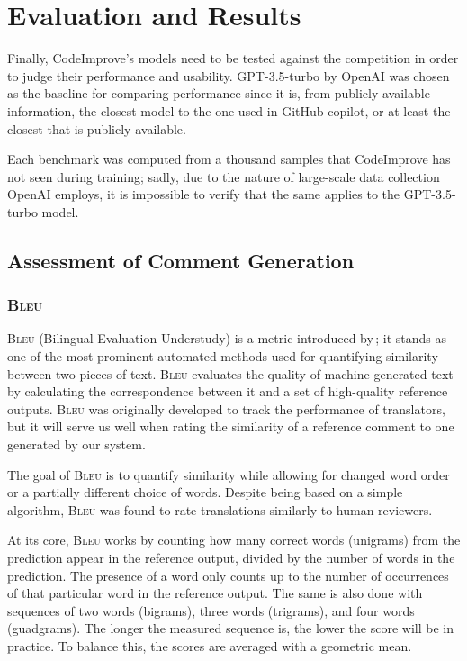 \chapter{Evaluation and Results}
    Finally, CodeImprove's models need to be tested against the competition in order to judge their performance and usability.  GPT-3.5-turbo by OpenAI was chosen as the baseline for comparing performance since it is, from publicly available information, the closest model to the one used in GitHub copilot, or at least the closest that is publicly available.
    
    Each benchmark was computed from a thousand samples that CodeImprove has not seen during training; sadly, due to the nature of large-scale data collection OpenAI employs, it is impossible to verify that the same applies to the GPT-3.5-turbo model.
    
    \section{Assessment of Comment Generation}
        \subsection{\textsc{Bleu}}
        \textsc{Bleu} (Bilingual Evaluation Understudy) is a metric introduced by\,\cite{papineni-etal-2002-bleu}; it stands as one of the most prominent automated methods used for quantifying similarity between two pieces of text. \textsc{Bleu} evaluates the quality of machine-generated text by calculating the correspondence between it and a set of high-quality reference outputs. \textsc{Bleu} was originally developed to track the performance of translators, but it will serve us well when rating the similarity of a reference comment to one generated by our system.
        
        The goal of \textsc{Bleu} is to quantify similarity while allowing for changed word order or a partially different choice of words. Despite being based on a simple algorithm, \textsc{Bleu} was found to rate translations similarly to human reviewers.
        
        At its core, \textsc{Bleu} works by counting how many correct words (unigrams) from the prediction appear in the reference output, divided by the number of words in the prediction. The presence of a word only counts up to the number of occurrences of that particular word in the reference output. 
        The same is also done with sequences of two words (bigrams), three words (trigrams), and four words (guadgrams). The longer the measured sequence is, the lower the score will be in practice. To balance this, the scores are averaged with a geometric mean.
        
